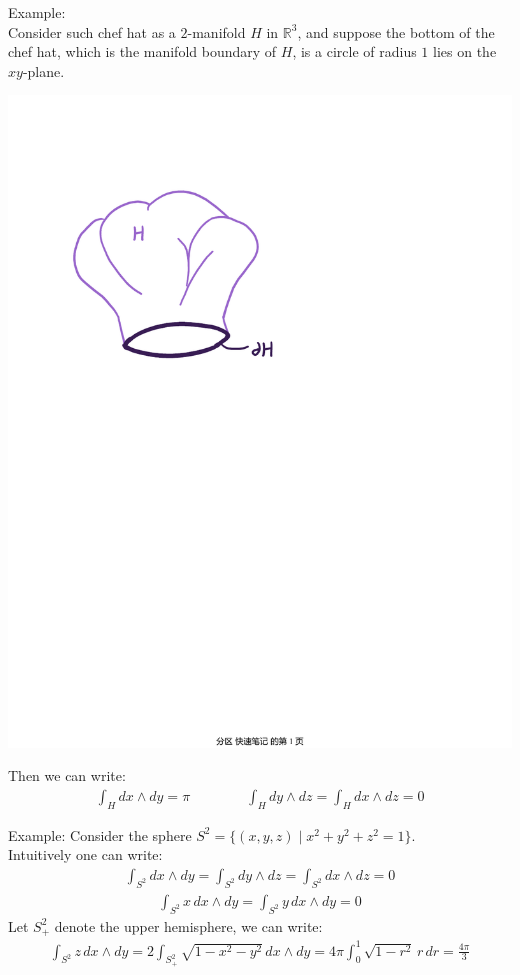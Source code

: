 \documentclass[15pt]{book}
\theoremstyle{break}
\theoremstyle{break}
\newcommand{\R}{\mathbb{R}}
\newcommand{\example}{\color{green}Example: \color{black}}
\begin{document}
\example\\
Consider such chef hat as a $2$-manifold $H$ in $\R^3$, and suppose the bottom of the chef hat, which is the manifold boundary of $H$, is a circle of radius $1$ lies on the $xy$-plane. 
\begin{center}
\includegraphics[scale=0.65]{chef-hat.pdf}\\
\end{center}
Then we can write:
\begin{align*}
\int_H dx\wedge dy = \pi \qquad\qquad \int_H dy \wedge dz = \int_H dx\wedge dz = 0
\end{align*} 

\hfill\break\hfill\break\hfill\break
\example Consider the sphere $S^2= \{(x,y,z)\mid x^2+y^2+z^2 = 1\}$.\\ Intuitively one can write:
\begin{align*}
\int_{S^2} dx\wedge dy  = \int_{S^2} dy\wedge dz = \int_{S^2} dx\wedge dz = 0
\end{align*}
\begin{align*}
\int_{S^2} x\, dx\wedge dy = \int_{S^2} y \, dx\wedge dy = 0
\end{align*}
Let $S^2_+$ denote the upper hemisphere, we can write:
\begin{align*}
\int_{S^2} z \, dx\wedge dy = 2\int_{S^2_+} \sqrt{1-x^2-y^2} \, dx\wedge dy = 4\pi \int_0^1 \sqrt{1-r^2}\, r \, dr = \frac{4\pi}{3}
\end{align*}
\end{document}
